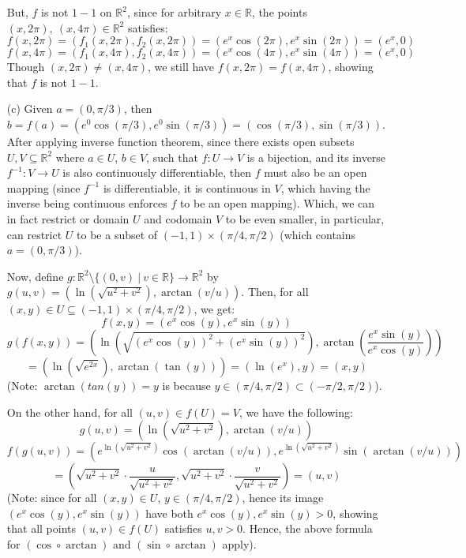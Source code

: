 \documentclass{article}
\begin{document}
\begin{itemize}
    But, $f$ is not $1-1$ on $\mathbb{R}^2$, since for arbitrary $x\in \mathbb{R}$, the points $(x,2\pi),\ (x,4\pi)\in\mathbb{R}^2$ satisfies:
    $$f(x,2\pi) = (f_1(x,2\pi),f_2(x,2\pi))=(e^x\cos(2\pi),e^x\sin(2\pi)) = (e^x,0)$$
    $$f(x,4\pi) = (f_1(x,4\pi),f_2(x,4\pi))=(e^x\cos(4\pi),e^x\sin(4\pi)) = (e^x,0)$$
    Though $(x,2\pi)\neq (x,4\pi)$, we still have $f(x,2\pi)=f(x,4\pi)$, showing that $f$ is not $1-1$.

    \hfil

    \item[(c)] Given $a=(0,\pi/3)$, then $b=f(a)=(e^0\cos(\pi/3),e^0\sin(\pi/3)) = (\cos(\pi/3),\sin(\pi/3))$. After applying inverse function theorem, since there exists open subsets $U,V\subseteq \mathbb{R}^2$ where $a\in U$, $b\in V$,
    such that $f:U\rightarrow V$ is a bijection, and its inverse $f^{-1}:V\rightarrow U$ is also continuously differentiable, then $f$ must also be an open mapping (since $f^{-1}$ is differentiable, it is continuous in $V$, which having the inverse being continuous enforces $f$ to be an open mapping).
    Which, we can in fact restrict or domain $U$ and codomain $V$ to be even smaller, in particular, can restrict $U$ to be a subset of $(-1,1)\times (\pi/4,\pi/2)$ (which contains $a=(0,\pi/3)$).

    Now, define $g:\mathbb{R}^2\setminus\{(0,v)\ |\ v\in\mathbb{R}\}\rightarrow \mathbb{R}^2$ by $g(u,v)=(\ln(\sqrt{u^2+v^2}),\arctan(v/u))$. Then, for all $(x,y)\in U\subseteq (-1,1)\times (\pi/4,\pi/2)$, we get:
    $$f(x,y) = (e^x\cos(y),e^x\sin(y))$$
    $$g(f(x,y)) = \left(\ln\left(\sqrt{(e^x\cos(y))^2+(e^x\sin(y))^2}\right), \arctan\left(\frac{e^x\sin(y)}{e^x\cos(y)}\right)\right)$$
    $$ = (\ln(\sqrt{e^{2x}}), \arctan(\tan(y))) = (\ln(e^x), y) = (x,y)$$
    (Note: $\arctan(tan(y))=y$ is because $y\in (\pi/4,\pi/2)\subset (-\pi/2,\pi/2)$).

    On the other hand, for all $(u,v)\in f(U) = V$, we have the following:
    $$g(u,v)=(\ln(\sqrt{u^2+v^2}),\arctan(v/u))$$
    $$f(g(u,v)) = \left(e^{\ln(\sqrt{u^2+v^2})}\cos(\arctan(v/u)),e^{\ln(\sqrt{u^2+v^2})}\sin(\arctan(v/u))\right)$$
    $$ = \left(\sqrt{u^2+v^2}\cdot\frac{u}{\sqrt{u^2+v^2}},\sqrt{u^2+v^2}\cdot \frac{v}{\sqrt{u^2+v^2}}\right) = (u,v)$$
    (Note: since for all $(x,y)\in U$, $y\in (\pi/4,\pi/2)$, hence its image $(e^x\cos(y),e^x\sin(y))$ have both $e^x\cos(y),e^x\sin(y)>0$, showing that all points $(u,v)\in f(U)$ satisfies $u,v>0$. Hence, the above formula for $(\cos\circ \arctan)$ and $(\sin\circ \arctan)$ apply).


\end{itemize}
\end{document}
